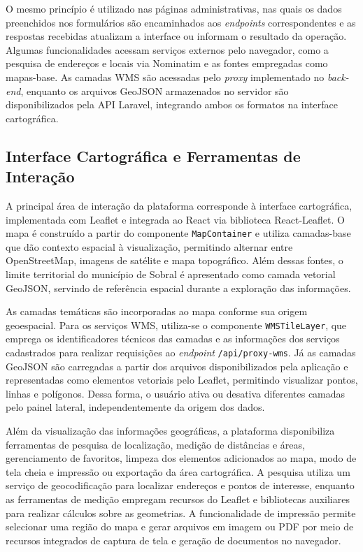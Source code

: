 O mesmo princípio é utilizado nas páginas administrativas, nas quais os dados preenchidos nos formulários são encaminhados aos \textit{endpoints} correspondentes e as respostas recebidas atualizam a interface ou informam o resultado da operação. Algumas funcionalidades acessam serviços externos pelo navegador, como a pesquisa de endereços e locais via Nominatim e as fontes empregadas como mapas-base. As camadas WMS são acessadas pelo \textit{proxy} implementado no \textit{back-end}, enquanto os arquivos GeoJSON armazenados no servidor são disponibilizados pela API Laravel, integrando ambos os formatos na interface cartográfica.

\subsection{Interface Cartográfica e Ferramentas de Interação}
\label{sec:interface-cartografica}

A principal área de interação da plataforma corresponde à interface cartográfica, implementada com Leaflet e integrada ao React via biblioteca React-Leaflet. O mapa é construído a partir do componente \texttt{MapContainer} e utiliza camadas-base que dão contexto espacial à visualização, permitindo alternar entre OpenStreetMap, imagens de satélite e mapa topográfico. Além dessas fontes, o limite territorial do município de Sobral é apresentado como camada vetorial GeoJSON, servindo de referência espacial durante a exploração das informações.

As camadas temáticas são incorporadas ao mapa conforme sua origem geoespacial. Para os serviços WMS, utiliza-se o componente \texttt{WMSTileLayer}, que emprega os identificadores técnicos das camadas e as informações dos serviços cadastrados para realizar requisições ao \textit{endpoint} \texttt{/api/proxy-wms}. Já as camadas GeoJSON são carregadas a partir dos arquivos disponibilizados pela aplicação e representadas como elementos vetoriais pelo Leaflet, permitindo visualizar pontos, linhas e polígonos. Dessa forma, o usuário ativa ou desativa diferentes camadas pelo painel lateral, independentemente da origem dos dados.

Além da visualização das informações geográficas, a plataforma disponibiliza ferramentas de pesquisa de localização, medição de distâncias e áreas, gerenciamento de favoritos, limpeza dos elementos adicionados ao mapa, modo de tela cheia e impressão ou exportação da área cartográfica. A pesquisa utiliza um serviço de geocodificação para localizar endereços e pontos de interesse, enquanto as ferramentas de medição empregam recursos do Leaflet e bibliotecas auxiliares para realizar cálculos sobre as geometrias. A funcionalidade de impressão permite selecionar uma região do mapa e gerar arquivos em imagem ou PDF por meio de recursos integrados de captura de tela e geração de documentos no navegador.

